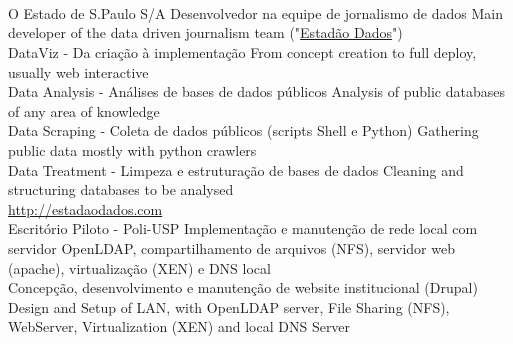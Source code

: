 \documentclass[]{friggeri-cv}
\begin{document}
\begin{entrylist}
    {}
    {\href{http://participacao.mj.gov.br}{}}
    {\\
    \\
     \\
    }
  \entry
    {}
    {}
    {O Estado de S.Paulo S/A}
    {%
        {Desenvolvedor na equipe de jornalismo de dados}%
        {Main developer of the data driven journalism team}
        ("\href{http://estadaodados.com}{Estadão Dados}")\\
     DataViz - %
         {Da criação à implementação}%
         {From concept creation to full deploy, usually web interactive}\\
     Data Analysis - %
         {Análises de bases de dados públicos}%
         {Analysis of public databases of any area of knowledge}\\
     Data Scraping - %
         {Coleta de dados públicos (scripts Shell e Python)}%
         {Gathering public data mostly with python crawlers}\\
     Data Treatment - %
         {Limpeza e estruturação de bases de dados}%
         {Cleaning and structuring databases to be analysed}\\
     \href{http://estadaodados.com}{http://estadaodados.com}\\}
   \entry
    {}
    {}
    {Escritório Piloto - Poli-USP}
    {%
        {Implementação e manutenção de rede local com servidor OpenLDAP, \nohyphens{compartilhamento} de arquivos (NFS), servidor web (apache), virtualização (XEN) e DNS local\\
        Concepção, desenvolvimento e manutenção de website institucional (Drupal)\\}%
        {Design and Setup of LAN, with OpenLDAP server, File Sharing (NFS), WebServer, Virtualization (XEN) and local DNS Server\\
}}
\end{entrylist}
\end{document}
